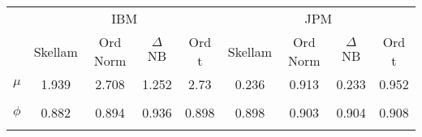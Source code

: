 \begin{footnotesize}
\tabcolsep=0.07cm
\begin{singlespace}
\begin{tabular}{ccccccccc} \toprule 
& \multicolumn{4}{c}{IBM}& \multicolumn{4}{c}{JPM} \\ 
\cmidrule(r){2-5} \cmidrule(r){6-9} &  \multicolumn{1}{c}{Skellam}&  \multicolumn{1}{c}{Ord Norm}&  \multicolumn{1}{c}{$\Delta$NB}&  \multicolumn{1}{c}{Ord t}&  \multicolumn{1}{c}{Skellam}&  \multicolumn{1}{c}{Ord Norm}&  \multicolumn{1}{c}{$\Delta$NB}&  \multicolumn{1}{c}{Ord t} \\ \midrule
$ \mu $ & 1.939 & 2.708 & 1.252 & 2.73 & 0.236 & 0.913 & 0.233 & 0.952 \\ 
 & \begin{tiny} [1.865,2.013] \end{tiny}  & \begin{tiny} [2.633,2.783] \end{tiny}  & \begin{tiny} [1.203,1.299] \end{tiny}  & \begin{tiny} [2.657,2.806] \end{tiny}  & \begin{tiny} [0.191,0.28] \end{tiny}  & \begin{tiny} [0.866,0.961] \end{tiny}  & \begin{tiny} [0.191,0.277] \end{tiny}  & \begin{tiny} [0.906,0.999] \end{tiny}  \\ 
$ \phi $ & 0.882 & 0.894 & 0.936 & 0.898 & 0.898 & 0.903 & 0.904 & 0.908 \\ 
 & \begin{tiny} [0.874,0.891] \end{tiny}  & \begin{tiny} [0.888,0.901] \end{tiny}  & \begin{tiny} [0.931,0.941] \end{tiny}  & \begin{tiny} [0.892,0.905] \end{tiny}  & \begin{tiny} [0.895,0.903] \end{tiny}  & \begin{tiny} [0.898,0.907] \end{tiny}  & \begin{tiny} [0.9,0.91] \end{tiny}  & \begin{tiny} [0.903,0.912] \end{tiny}  \\ 

\end{tabular}
\end{singlespace}
\end{footnotesize}

